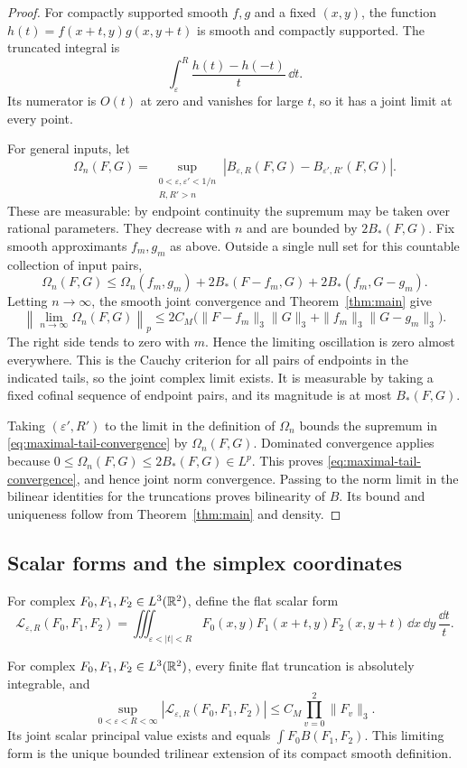 \begin{proof}
For compactly supported smooth $f,g$ and a fixed $(x,y)$, the function
$h(t)=f(x+t,y)g(x,y+t)$ is smooth and compactly supported.  The truncated
integral is
\[
 \int_\varepsilon^R\frac{h(t)-h(-t)}t\,\dd t.
\]
Its numerator is $O(t)$ at zero and vanishes for large $t$, so it has a
joint limit at every point.

For general inputs, let
\[
 \Omega_n(F,G)=
 \sup_{\substack{0<\varepsilon,\varepsilon'<1/n\\R,R'>n}}
 |B_{\varepsilon,R}(F,G)-B_{\varepsilon',R'}(F,G)|.
\]
These are measurable: by endpoint continuity the supremum may be taken
over rational parameters.  They decrease with $n$ and are bounded by
$2B_*(F,G)$.  Fix smooth approximants $f_m,g_m$ as above.  Outside a
single null set for this countable collection of input pairs,
\[
 \Omega_n(F,G)\le\Omega_n(f_m,g_m)
       +2B_*(F-f_m,G)+2B_*(f_m,G-g_m).
\]
Letting $n\to\infty$, the smooth joint convergence and
Theorem~\ref{thm:main} give
\[
 \left\|\lim_{n\to\infty}\Omega_n(F,G)\right\|_p
 \le 2C_M\bigl(\|F-f_m\|_3\|G\|_3
              +\|f_m\|_3\|G-g_m\|_3\bigr).
\]
The right side tends to zero with $m$.  Hence the limiting oscillation
is zero almost everywhere.  This is the Cauchy criterion for all pairs
of endpoints in the indicated tails, so the joint complex limit exists.
It is measurable by taking a fixed cofinal sequence of endpoint pairs,
and its magnitude is at most $B_*(F,G)$.

Taking $(\varepsilon',R')$ to the limit in the definition of
$\Omega_n$ bounds the supremum in
\eqref{eq:maximal-tail-convergence} by $\Omega_n(F,G)$.
Dominated convergence applies because
$0\le\Omega_n(F,G)\le2B_*(F,G)\in L^p$.
This proves \eqref{eq:maximal-tail-convergence}, and hence joint norm
convergence.  Passing to the norm limit in the bilinear identities for
the truncations proves bilinearity of $B$.  Its bound and uniqueness
follow from Theorem~\ref{thm:main} and density.
\end{proof}

\subsection{Scalar forms and the simplex coordinates}

For complex $F_0,F_1,F_2\in L^3(\mathbb R^2)$, define the flat scalar form
\[
 \mathcal L_{\varepsilon,R}(F_0,F_1,F_2)
 =\iiint_{\varepsilon<|t|<R}
 F_0(x,y)F_1(x+t,y)F_2(x,y+t)
 \,\dd x\,\dd y\,\frac{\dd t}{t}.
\]
\begin{corollary}\label{cor:scalar-pv}
For complex $F_0,F_1,F_2\in L^3(\mathbb R^2)$, every finite flat truncation is
absolutely integrable, and
\[
 \sup_{0<\varepsilon<R<\infty}
 |\mathcal L_{\varepsilon,R}(F_0,F_1,F_2)|
 \le C_M\prod_{v=0}^2\|F_v\|_3.
\]
Its joint scalar principal value exists and equals
$\int F_0 B(F_1,F_2)$.  This limiting form is the unique bounded
trilinear extension of its compact smooth definition.
\end{corollary}


